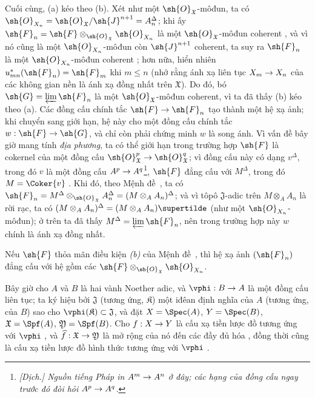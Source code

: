 \documentclass[oneside]{amsart}
\makeatletter
\renewcommand{\leq}{\leqslant}
\newcommand{\ega@arrow}[2]{\mathchoice{#1}{#2}{#2}{#2}}
\renewcommand{\to}{\ega@arrow{\longrightarrow}{\rightarrow}}
\let\EGAOriginalLabel\label
\renewcommand{\label}[1]{\phantomsection\EGAOriginalLabel{#1}}
\makeatother
\begin{document}
Cuối cùng, (a) kéo theo (b).
Xét như một $\sh{O}_\mathfrak{X}$-môđun, ta có $\sh{O}_{X_n}=\sh{O}_\mathfrak{X}/\sh{J}^{n+1}=A_n^\Delta$; khi ấy $\sh{F}_n=\sh{F}\otimes_{\sh{O}_\mathfrak{X}}\sh{O}_{X_n}$ là một $\sh{O}_\mathfrak{X}$-môđun coherent , và vì nó cũng là một $\sh{O}_{X_n}$-môđun còn $\sh{J}^{n+1}$ coherent, ta suy ra $\sh{F}_n$ là một $\sh{O}_{X_n}$-môđun coherent ; hơn nữa, hiển nhiên $u_{mn}^*(\sh{F}_n)=\sh{F}_m$ khi $m\leq n$ (nhớ rằng ánh xạ liên tục $X_m\to X_n$ của các không gian nền là ánh xạ đồng nhất trên $\mathfrak{X}$).
Do đó, bó $\sh{G}=\varprojlim\sh{F}_n$ là một $\sh{O}_\mathfrak{X}$-môđun coherent, vì ta đã thấy (b) kéo theo (a). Các đồng cấu chính tắc $\sh{F}\to\sh{F}_n$ tạo thành một hệ xạ ảnh; khi chuyển sang giới hạn, hệ này cho một đồng cấu chính tắc $w:\sh{F}\to\sh{G}$, và chỉ còn phải chứng minh $w$ là song ánh.
Vì vấn đề bây giờ mang tính \emph{địa phương}, ta có thể giới hạn trong trường hợp $\sh{F}$ là cokernel của một đồng cấu $\sh{O}_\mathfrak{X}^p\to\sh{O}_\mathfrak{X}^q$; vì đồng cấu này có dạng $v^\Delta$, trong đó $v$ là một đồng cấu $A^p\to A^q$\footnote{\emph{[Dịch.] Nguồn tiếng Pháp in $A^m\to A^n$ ở đây; các hạng của đồng cấu ngay trước đó đòi hỏi $A^p\to A^q$.}}, $\sh{F}$ đẳng cấu với $M^\Delta$, trong đó $M=\Coker{v}$ .
Khi đó, theo Mệnh đề~, ta có $\sh{F}_n=M^\Delta\otimes_{\sh{O}_\mathfrak{X}}A_n^\Delta=(M\otimes_A A_n)^\Delta$; và vì tôpô $\mathfrak{J}$-adic trên $M\otimes_A A_n$ là rời rạc, ta có $(M\otimes_A A_n)^\Delta=(M\otimes_A A_n)\supertilde$ (như một $\sh{O}_{X_n}$-môđun); ở trên ta đã thấy $M^\Delta=\varprojlim\sh{F}_n$, nên trong trường hợp này $w$ chính là ánh xạ đồng nhất.

\begin{corollary}[10.10.6]
\label{I.10.10.6}
Nếu $\sh{F}$ thỏa mãn điều kiện \emph{(b)} của Mệnh đề~, thì hệ xạ ảnh $(\sh{F}_n)$ đẳng cấu với hệ gồm các $\sh{F}\otimes_{\sh{O}_\mathfrak{X}}\sh{O}_{X_n}$.
\end{corollary}

\begin{env}[10.10.7]
\label{I.10.10.7}
Bây giờ cho $A$ và $B$ là hai vành Noether adic, và $\vphi:B\to A$ là một đồng cấu liên tục; ta ký hiệu bởi $\mathfrak{J}$ (tương ứng, $\mathfrak{K}$) một iđêan định nghĩa của $A$ (tương ứng, của $B$) sao cho $\vphi(\mathfrak{K})\subset\mathfrak{J}$, và đặt $X=\Spec(A)$, $Y=\Spec(B)$, $\mathfrak{X}=\Spf(A)$, $\mathfrak{Y}=\Spf(B)$.
Cho $f:X\to Y$ là cấu xạ tiền lược đồ tương ứng với $\vphi$ , và $\widehat{f}:\mathfrak{X}\to\mathfrak{Y}$ là mở rộng của nó đến các đầy đủ hóa , đồng thời cũng là cấu xạ tiền lược đồ hình thức tương ứng với $\vphi$ .
\end{env}
\end{document}
